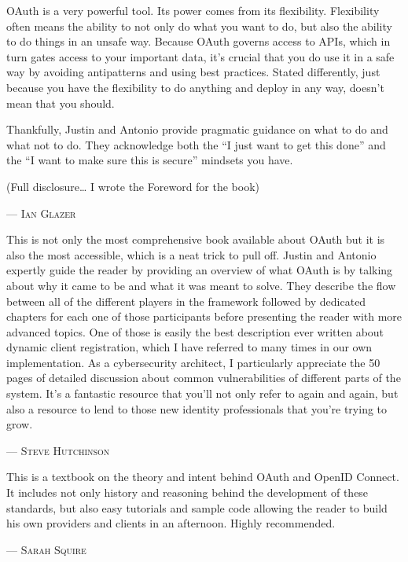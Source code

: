 OAuth is a very powerful tool. Its power comes from its flexibility. Flexibility often means the ability to not only do what you want to do, but also the ability to do things in an unsafe way. Because OAuth governs access to APIs, which in turn gates access to your important data, it’s crucial that you do use it in a safe way by avoiding antipatterns and using best practices. Stated differently, just because you have the flexibility to do anything and deploy in any way, doesn’t mean that you should.

Thankfully, Justin and Antonio provide pragmatic guidance on what to do and what not to do. They acknowledge both the “I just want to get this done” and the “I want to make sure this is secure” mindsets you have.

(Full disclosure… I wrote the Foreword for the book) 
\setlength{\parindent}{0cm}\par\textsc{ --- Ian Glazer }\par\vspace{12pt}\setlength{\parindent}{15pt}
This is not only the most comprehensive book available about OAuth but it is also the most accessible, which is a neat trick to pull off. Justin and Antonio expertly guide the reader by providing an overview of what OAuth is by talking about why it came to be and what it was meant to solve. They describe the flow between all of the different players in the framework followed by dedicated chapters for each one of those participants before presenting the reader with more advanced topics. One of those is easily the best description ever written about dynamic client registration, which I have referred to many times in our own implementation. As a cybersecurity architect, I particularly appreciate the 50 pages of detailed discussion about common vulnerabilities of different parts of the system. It’s a fantastic resource that you’ll not only refer to again and again, but also a resource to lend to those new identity professionals that you’re trying to grow. 
\setlength{\parindent}{0cm}\par\textsc{ --- Steve Hutchinson }\par\vspace{12pt}\setlength{\parindent}{15pt}
This is a textbook on the theory and intent behind OAuth and OpenID Connect. It includes not only history and reasoning behind the development of these standards, but also easy tutorials and sample code allowing the reader to build his own providers and clients in an afternoon. Highly recommended. 
\setlength{\parindent}{0cm}\par\textsc{ --- Sarah Squire }\par\vspace{12pt}\setlength{\parindent}{15pt}
